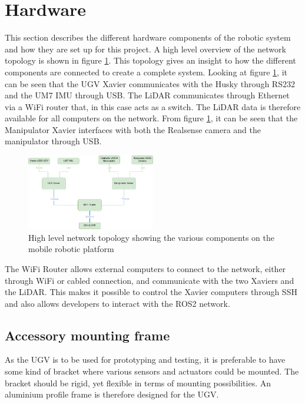  
\section{Hardware}
This section describes the different hardware components of the robotic system and how they are set up for this project. A high level overview of the network topology is shown in figure \ref{fig:topology}. This topology gives an insight to how the different components are connected to create a complete system. Looking at figure \ref{fig:topology}, it can be seen that the UGV Xavier communicates with the Husky through RS232 and the UM7 IMU through USB. The LiDAR communicates through Ethernet via a WiFi router that, in this case acts as a switch. The LiDAR data is therefore available for all computers on the network. From figure \ref{fig:topology}, it can be seen that the Manipulator Xavier interfaces with both the Realsense camera and the manipulator through USB. 

\begin{figure}[H]
  \centering
  \includegraphics[width = 0.5\textwidth]{Figures/example_figure.drawio.png}
  \caption{High level network topology showing the various components on the mobile robotic platform}
  \label{fig:topology}
\end{figure}

The WiFi Router allows external computers to connect to the network, either through WiFi or cabled connection, and communicate with the two Xaviers and the LiDAR. This makes it possible to control the Xavier computers through SSH and also allows developers to interact with the ROS2 network.

\subsection{Accessory mounting frame}
As the UGV is to be used for prototyping and testing, it is preferable to have some kind of bracket where various sensors and actuators could be mounted. The bracket should be rigid, yet flexible in terms of mounting possibilities. An aluminium profile frame is therefore designed for the UGV.

